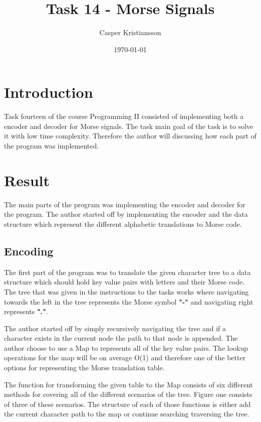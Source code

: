 \documentclass[a4paper,11pt]{article}
\begin{document}
\title{
    \textbf{Task 14 - Morse Signals}
}
\author{Casper Kristiansson}
\date{\today}
\maketitle

\section*{Introduction}
Task fourteen of the course Programming II consisted of implementing both a encoder and decoder for Morse signals. The task main goal of the task is to solve it with low time complexity. Therefore the author will discussing how each part of the program was implemented.

\section*{Result}
The main parts of the program was implementing the encoder and decoder for the program. The author started off by implementing the encoder and the data structure which represent the different alphabetic translations to Morse code.

\subsection*{Encoding}
The first part of the program was to translate the given character tree to a data structure which should hold key value pairs with letters and their Morse code. The tree that was given in the instructions to the tasks works where navigating towards the left in the tree represents the Morse symbol \textbf{"-"} and navigating right represents \textbf{"."}.

The author started off by simply recursively navigating the tree and if a character exists in the current node the path to that node is appended. The author choose to use a Map to represents all of the key value pairs. The lookup operations for the map will be on average O(1) and therefore one of the better options for representing the Morse translation table.

The function for transforming the given table to the Map consists of six different methods for covering all of the different scenarios of the tree. Figure one consists of three of these scenarios. The structure of each of those functions is either add the current character path to the map or continue searching traversing the tree.
\end{document}
